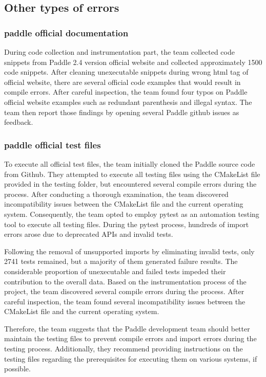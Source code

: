 \documentclass[sigconf]{acmart}
\begin{document}
  \subsection{Other types of errors}
  \subsubsection{paddle official documentation}
  During code collection and instrumentation part, the team collected code snippets from Paddle 2.4 version 
  official website and collected approximately 1500 code snippets. After cleaning unexecutable snippets during wrong 
  html tag of official website, there are several official code examples that would result in compile errors. After careful inspection, 
  the team found four typos on Paddle official website examples such as redundant parenthesis and illegal syntax. 
  The team then report those findings by opening several Paddle github issues as feedback\cite{r1, r2}.
  \subsubsection{paddle official test files}
  To execute all official test files, the team initially cloned the Paddle source code from Github. They attempted to execute all testing files using the CMakeList file provided in the testing folder, 
  but encountered several compile errors during the process. After conducting a thorough examination, the team discovered incompatibility issues between the CMakeList file and the current operating system. 
  Consequently, the team opted to employ pytest as an automation testing tool to execute all testing files. During the pytest process, hundreds of import errors arose due to deprecated APIs and invalid tests.

  Following the removal of unsupported imports by eliminating invalid tests, only 2741 tests remained, but a majority of them generated failure results. 
  The considerable proportion of unexecutable and failed tests impeded their contribution to the overall data. Based on the instrumentation process of the project, the team discovered several compile errors during the process. 
  After careful inspection, the team found several incompatibility issues between the CMakeList file and the current operating system.

  Therefore, the team suggests that the Paddle development team should better maintain the testing files to prevent compile errors and import errors during the testing process. 
  Additionally, they recommend providing instructions on the testing files regarding the prerequisites for executing them on various systems, if possible.
  
\end{document}
